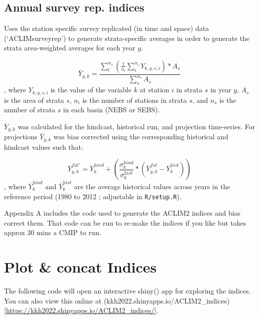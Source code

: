 \documentclass[
]{article}
\begin{document}
\hypertarget{annual-survey-rep.-indices}{%
\subsection{Annual survey rep.
indices}\label{annual-survey-rep.-indices}}

Uses the station specific survey replicated (in time and space) data
(`ACLIMsurveyrep') to generate strata-specific averages in order to
generate the strata area-weighted averages for each year \(y\).

\[\bar{Y}_{y,k}= \frac{\sum^{n_s}_{l}(\frac{1}{n_i}\sum^{n_i}_{i}Y_{k,y,s,i})*A_s} {\sum^{n_s}_{s}{A_s}}\],
where \(Y_{k,y,s,i}\) is the value of the variable \(k\) at station
\(i\) in strata \(s\) in year \(y\), \(A_s\) is the area of strata
\(s\), \(n_i\) is the number of stations in strata \(s\), and \(n_s\) is
the number of strata \(s\) in each basin (NEBS or SEBS).

\(\bar{Y}_{y,k}\) was calculated for the hindcast, historical run, and
projection time-series. For projections \(\bar{Y}_{y,k}\) was bias
corrected using the corresponding historical and hindcast values such
that:

\[\bar{Y}^{fut'}_{y,k} =\bar{Y}^{hind}_{k} +\left( \frac{\sigma^{hind}_{k}}{\sigma^{hist}_{k}}*(\bar{Y}^{fut}_{y,k}-\bar{Y}^{hist}_{k})  \right )\],
where \(\bar{Y}^{hind}_{k}\) and \(\bar{Y}^{hist}_{k}\) are the average
historical values across years in the reference period (1980 to 2012 ;
adjustable in \texttt{R/setup.R}).

Appendix A includes the code used to generate the ACLIM2 indices and
bias correct them. That code can be run to re-make the indices if you
like but takes approx 30 mins a CMIP to run.

\hypertarget{plot-concat-indices}{%
\section{Plot \& concat Indices}\label{plot-concat-indices}}

The following code will open an interactive shiny() app for exploring
the indices. You can also view this online at
(kkh2022.shinyapps.io/ACLIM2\_indices){[}\url{https://kkh2022.shinyapps.io/ACLIM2_indices/}{]}.
\end{document}
